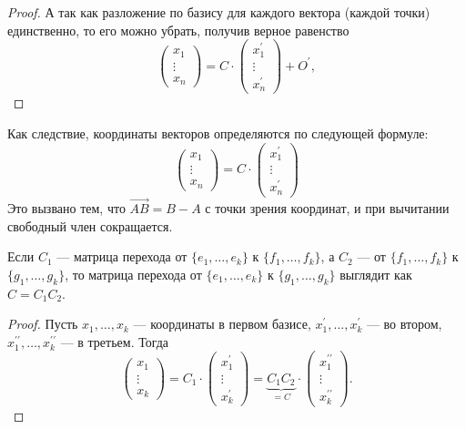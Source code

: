 \begin{proof}
    А так как разложение по базису для каждого вектора (каждой точки) единственно, то его можно убрать, получив верное равенство
    $$
    \begin{pmatrix}
        x_1\\
        \vdots\\
        x_n
    \end{pmatrix} = C \cdot
    \begin{pmatrix}
        x_1^\prime\\
        \vdots\\
        x_n^\prime
    \end{pmatrix} + O^\prime,
    $$
\end{proof}

\begin{orangebox}
    Как следствие, координаты векторов определяются по следующей формуле:
    $$
    \begin{pmatrix}
        x_1\\
        \vdots\\
        x_n
    \end{pmatrix} = C \cdot
    \begin{pmatrix}
        x_1^\prime\\
        \vdots\\
        x_n^\prime
    \end{pmatrix}
    $$
    Это вызвано тем, что $\overrightarrow{AB} = B - A$ с точки зрения координат, и при вычитании свободный член сокращается.
\end{orangebox}

\begin{statement}
    Если $C_1$ --- матрица перехода от $\{e_1, \ldots, e_k\}$ к $\{f_1, \ldots, f_k\}$, а $C_2$ --- от $\{f_1, \ldots, f_k\}$ к $\{g_1, \ldots, g_k\}$, то матрица перехода от $\{e_1, \ldots, e_k\}$ к $\{g_1, \ldots, g_k\}$ выглядит как $C = C_1C_2$.
\end{statement}

\begin{proof}
    Пусть $x_1, \ldots, x_k$ --- координаты в первом базисе, $x_1^\prime, \ldots, x_k^\prime$ --- во втором, $x_1^{\prime\prime}, \ldots, x_k^{\prime\prime}$ --- в третьем. Тогда
    $$
    \begin{pmatrix}
        x_1\\
        \vdots\\
        x_k
    \end{pmatrix} = C_1 \cdot
    \begin{pmatrix}
        x_1^\prime\\
        \vdots\\
        x_k^\prime
    \end{pmatrix} = \underbrace{C_1C_2}_{{} = C} \cdot
    \begin{pmatrix}
        x_1^{\prime\prime}\\
        \vdots\\
        x_k^{\prime\prime}
    \end{pmatrix}.
    $$
\end{proof}


